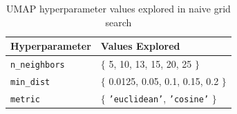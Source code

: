 \documentclass[10pt,oneside]{report}
\begin{document}
\begin{table}[htbp]
    \fontsize{8}{11}\selectfont %
    \centering
    \caption{UMAP hyperparameter values explored in naive grid search} %
    \label{tab:umapgrid} %
    \renewcommand{\arraystretch}{1.2} %
    \begin{tabular}{p{3cm}|p{8.5cm}} %
        \toprule %
        \textbf{Hyperparameter} & \textbf{Values Explored} \\ %
        \midrule %
        \texttt{n\_neighbors} & $\big\{$ 5, 10, 13, 15, 20, 25 $\big\}$ \\ %
        \texttt{min\_dist}    & $\big\{$ 0.0125, 0.05, 0.1, 0.15, 0.2 $\big\}$\\ %
        \texttt{metric}       & $\big\{$ \texttt{'euclidean'}, \texttt{'cosine'} $\big\}$\\ %
        \bottomrule %
    \end{tabular}
    \renewcommand{\arraystretch}{1.0} %
\end{table}




\end{document}
